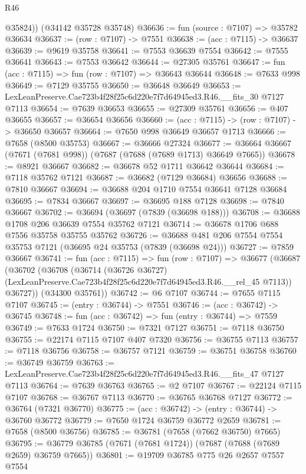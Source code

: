 \begin{lexlean}{R46}
\begin{coremodule}
        @35824))
    (@34142 @35728 @35748)
@36636 := fun (source : @7107) => @35782 @36634
@36637 := (row : @7107) -> @7551
@36638 := (acc : @7115) -> @36637
@36639 := @9619 @35758
@36641 := @7553 @36639 @7554
@36642 := @7555 @36641
@36643 := @7553 @36642
@36644 := @27305 @35761
@36647 := fun (acc : @7115) => fun (row : @7107) => @36643 @36644
@36648 := @7633 @998
@36649 := @7129 @35755
@36650 := @36648 @36649
@36653 := LexLeanPreserve.Cae723b4f28f25c6d220e7f7d64945ed3.R46.__fits_30 @7127 @7113
@36654 := @7639 @36653
@36655 := @27309 @35761
@36656 := @407 @36655
@36657 := @36654 @36656
@36660 := (acc : @7115) -> (row : @7107) -> @36650 @36657
@36664 := @7650 @998 @36649 @36657 @1713
@36666 := @7658 (@8500 @35753)
@36667 := @36666 @27324
@36677 := @36664 @36667 (@7671 (@7681 @998)) (@7687 (@7688 (@7689 @1713) @36649 @7665))
@36678 := @8921 @36667
@36682 := @36678 @52 @1711 @36642 @36644
@36684 := @7118 @35762 @7121
@36687 := @36682 (@7129 @36684) @36656
@36688 := @7810 @36667
@36694 := @36688 @204 @1710 @7554 @36641 @7128 @36684
@36695 := @7834 @36667
@36697 := @36695 @188 @7128
@36698 := @7840 @36667
@36702 := @36694 (@36697 (@7839 (@36698 @188)))
@36708 := @36688 @1708 @206 @36639 @7554 @35762 @7121
@36714 := @36678 @1706 @688 @7556 @35758 @35755 @35762
@36726 := @36688 @481 @206 @7554 @7554 @35753 @7121 (@36695 @24 @35753 (@7839 (@36698 @24)))
@36727 := @7859 @36667
@36741 := fun (acc : @7115) =>
  fun (row : @7107) =>
  @36677
    (@36687
      (@36702
        (@36708
          (@36714
            (@36726 @36727)
            (LexLeanPreserve.Cae723b4f28f25c6d220e7f7d64945ed3.R46.__rel_45 @7113))
          @36727))
      (@34300 @35761))
@36742 := @6 @7107
@36744 := @7655 @7115 @7107
@36745 := (entry : @36744) -> @7551
@36746 := (acc : @36742) -> @36745
@36748 := fun (acc : @36742) => fun (entry : @36744) => @7559
@36749 := @7633 @1724
@36750 := @7321 @7127
@36751 := @7118 @36750
@36755 := @22174 @7115 @7107 @407 @7320
@36756 := @36755 @7113
@36757 := @7118 @36756
@36758 := @36757 @7121
@36759 := @36751 @36758
@36760 := @36749 @36759
@36763 := LexLeanPreserve.Cae723b4f28f25c6d220e7f7d64945ed3.R46.__fits_47 @7127 @7113
@36764 := @7639 @36763
@36765 := @2 @7107
@36767 := @22124 @7115 @7107
@36768 := @36767 @7113
@36770 := @36765 @36768 @7127
@36772 := @36764 (@7321 @36770)
@36775 := (acc : @36742) -> (entry : @36744) -> @36760 @36772
@36779 := @7650 @1724 @36759 @36772 @2659
@36781 := @7658 (@8500 @36756)
@36785 := @36781 (@7658 (@7662 @36750) @7665)
@36795 := @36779 @36785 (@7671 (@7681 @1724)) (@7687 (@7688 (@7689 @2659) @36759 @7665))
@36801 := @19709 @36785 @775 @26 @2657 @7557 @7554

\end{coremodule}
\end{lexlean}
